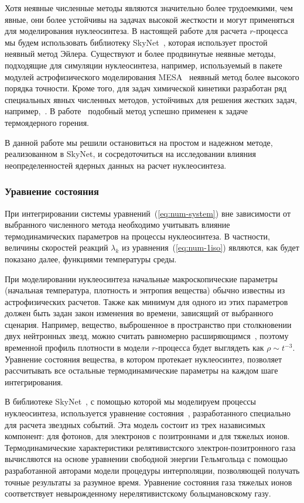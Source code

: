 Хотя неявные численные методы являются значительно более трудоемкими, чем явные, они более устойчивы на задачах высокой жесткости и могут применяться для моделирования нуклеосинтеза. В настоящей работе для расчета $r$-процесса мы будем использовать библиотеку SkyNet~\cite{lippuner2017}, которая использует простой неявный метод Эйлера. Существуют и более продвинутые неявные методы, подходящие для симуляции нуклеосинтеза, например, используемый в пакете модулей астрофизического моделирования MESA~\cite{paxton2011} неявный метод более высокого порядка точности. Кроме того, для задач химической кинетики разработан ряд специальных явных численных методов, устойчивых для решения жестких задач, например,~\cite{bulatov2018}. В работе~\cite{guidry2013} подобный метод успешно применен к задаче термоядерного горения.

В данной работе мы решили остановиться на простом и надежном методе, реализованном в SkyNet, и сосредоточиться на исследовании влияния неопределенностей ядерных данных на расчет нуклеосинтеза.

\subsubsection{Уравнение состояния}
\label{sec:eos}
При интегрировании системы уравнений~(\ref{eq:num-system}) вне зависимости от выбранного численного метода необходимо учитывать влияние термодинамических параметров на процессы нуклеосинтеза. В частности, величины скоростей реакций $\lambda_k$ из уравнения~(\ref{eq:num-1iso}) являются, как будет показано далее, функциями температуры среды. 

При моделировании нуклеосинтеза начальные макроскопические параметры (начальная температура, плотность и энтропия вещества) обычно известны из астрофизических расчетов. Также как минимум для одного из этих параметров должен быть задан закон изменения во времени, зависящий от выбранного сценария. Например, вещество, выброшенное в пространство при столкновении двух нейтронных звезд, можно считать равномерно расширяющимся~\cite{korobkin2012}, поэтому временной профиль плотности в модели $r$-процесса будет выглядеть как $\rho \sim t^{-3}$. Уравнение состояния вещества, в котором протекает нуклеосинтез, позволяет рассчитывать все остальные термодинамические параметры на каждом шаге интегрирования.

В библиотеке SkyNet~\cite{lippuner2017}, с помощью которой мы моделируем процессы нуклеосинтеза, используется уравнение состояния~\cite{timmes1999,timmes2000}, разработанного специально для расчета звездных событий. Эта модель состоит из трех назависимых компонент: для фотонов, для электронов с позитроннами и для тяжелых ионов. Термодинамические характеристики релятивистского электрон-позитронного газа вычисляются на основе уравнении свободной энергии Гельмгольца с помощью разработанной авторами модели процедуры интерполяции, позволяющей получать точные результаты за разумное время. Уравнение состояния газа тяжелых ионов соответствует невырожденному нерелятивистскому больцмановскому газу.

